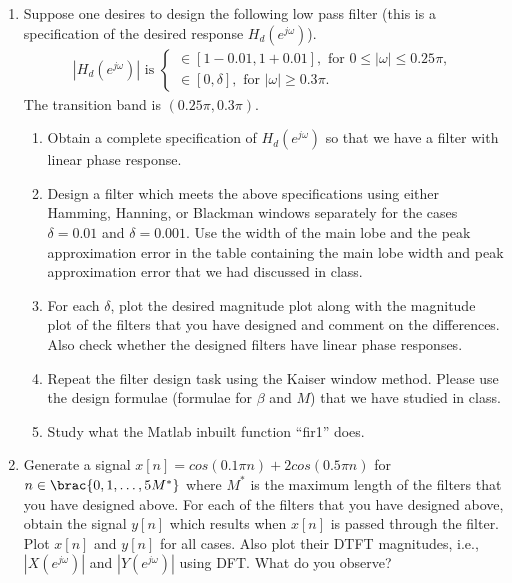 \begin{enumerate}
\item Suppose one desires to design the following low pass filter (this is a specification of the desired response $H_{d}(e^{j\omega})$).
  \begin{eqnarray*}
    |H_{d}(e^{j\omega})| \text{ is }
    \begin{cases}
      \in [1 - 0.01, 1 + 0.01], \text{ for } 0 \leq |\omega| \leq 0.25 \pi, \\
      \in [0, \delta], \text{ for } |\omega| \geq 0.3\pi.
    \end{cases}
  \end{eqnarray*}
  The transition band is $(0.25\pi, 0.3\pi)$.
  \begin{enumerate}
  \item Obtain a complete specification of $H_{d}(e^{j\omega})$ so that we have a filter with linear phase response.
  \item Design a filter which meets the above specifications using either Hamming, Hanning, or Blackman windows separately for the cases $\delta = 0.01$ and $\delta = 0.001$. Use the width of the main lobe and the peak approximation error in the table containing the main lobe width and peak approximation error that we had discussed in class.
  \item For each $\delta$, plot the desired magnitude plot along with the magnitude plot of the filters that you have designed and comment on the differences. Also check whether the designed filters have linear phase responses.
  \item Repeat the filter design task using the Kaiser window method. Please use the design formulae (formulae for $\beta$ and $M$) that we have studied in class.
  \item Study what the Matlab inbuilt function ``fir1'' does. 
  \end{enumerate}
\item Generate a signal $x[n] = cos(0.1\pi n) + 2 cos(0.5\pi n)$ for $n \in \brac{0, 1, \dots, 5M^{*}}$ where $M^*$ is the maximum length of the filters that you have designed above. For each of the filters that you have designed above, obtain the signal $y[n]$ which results when $x[n]$ is passed through the filter. Plot $x[n]$ and $y[n]$ for all cases. Also plot their DTFT magnitudes, i.e., $|X(e^{j\omega})|$ and $|Y(e^{j\omega})|$ using DFT. What do you observe?


\end{enumerate}
